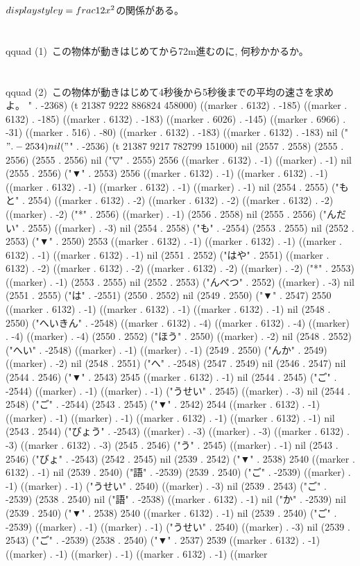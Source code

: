$\\displaystyle y=\\frac{1}{2}x^{2}$の関係がある。
\\\\
\\qquad (1)~この物体が動きはじめてから72m進むのに, 何秒かかるか。
\\\\
\\qquad (2)~この物体が動きはじめて4秒後から5秒後までの平均の速さを求め
よ。
" . -2368) (t 21387 9222 886824 458000) ((marker . 6132) . -185) ((marker . 6132) . -185) ((marker . 6132) . -183) ((marker . 6026) . -145) ((marker . 6966) . -31) ((marker . 516) . -80) ((marker . 6132) . -183) ((marker . 6132) . -183) nil ("$" . -2534) nil ("$" . -2536) (t 21387 9217 782799 151000) nil (2557 . 2558) (2555 . 2556) (2555 . 2556) nil ("▽" . 2555) 2556 ((marker . 6132) . -1) ((marker) . -1) nil (2555 . 2556) ("▼" . 2553) 2556 ((marker . 6132) . -1) ((marker . 6132) . -1) ((marker . 6132) . -1) ((marker . 6132) . -1) ((marker) . -1) nil (2554 . 2555) ("もと" . 2554) ((marker . 6132) . -2) ((marker . 6132) . -2) ((marker . 6132) . -2) ((marker) . -2) ("*" . 2556) ((marker) . -1) (2556 . 2558) nil (2555 . 2556) ("んだい" . 2555) ((marker) . -3) nil (2554 . 2558) ("も" . -2554) (2553 . 2555) nil (2552 . 2553) ("▼" . 2550) 2553 ((marker . 6132) . -1) ((marker . 6132) . -1) ((marker . 6132) . -1) ((marker . 6132) . -1) nil (2551 . 2552) ("はや" . 2551) ((marker . 6132) . -2) ((marker . 6132) . -2) ((marker . 6132) . -2) ((marker) . -2) ("*" . 2553) ((marker) . -1) (2553 . 2555) nil (2552 . 2553) ("んべつ" . 2552) ((marker) . -3) nil (2551 . 2555) ("は" . -2551) (2550 . 2552) nil (2549 . 2550) ("▼" . 2547) 2550 ((marker . 6132) . -1) ((marker . 6132) . -1) ((marker . 6132) . -1) nil (2548 . 2550) ("へいきん" . -2548) ((marker . 6132) . -4) ((marker . 6132) . -4) ((marker) . -4) ((marker) . -4) (2550 . 2552) ("ほう" . 2550) ((marker) . -2) nil (2548 . 2552) ("へい" . -2548) ((marker) . -1) ((marker) . -1) (2549 . 2550) ("んか" . 2549) ((marker) . -2) nil (2548 . 2551) ("へ" . -2548) (2547 . 2549) nil (2546 . 2547) nil (2544 . 2546) ("▼" . 2543) 2545 ((marker . 6132) . -1) nil (2544 . 2545) ("ご" . -2544) ((marker) . -1) ((marker) . -1) ("うせい" . 2545) ((marker) . -3) nil (2544 . 2548) ("ご" . -2544) (2543 . 2545) ("▼" . 2542) 2544 ((marker . 6132) . -1) ((marker) . -1) ((marker) . -1) ((marker . 6132) . -1) ((marker . 6132) . -1) nil (2543 . 2544) ("びょう" . -2543) ((marker) . -3) ((marker) . -3) ((marker . 6132) . -3) ((marker . 6132) . -3) (2545 . 2546) ("う" . 2545) ((marker) . -1) nil (2543 . 2546) ("びょ" . -2543) (2542 . 2545) nil (2539 . 2542) ("▼" . 2538) 2540 ((marker . 6132) . -1) nil (2539 . 2540) ("語" . -2539) (2539 . 2540) ("ご" . -2539) ((marker) . -1) ((marker) . -1) ("うせい" . 2540) ((marker) . -3) nil (2539 . 2543) ("ご" . -2539) (2538 . 2540) nil ("語" . -2538) ((marker . 6132) . -1) nil ("か" . -2539) nil (2539 . 2540) ("▼" . 2538) 2540 ((marker . 6132) . -1) nil (2539 . 2540) ("ご" . -2539) ((marker) . -1) ((marker) . -1) ("うせい" . 2540) ((marker) . -3) nil (2539 . 2543) ("ご" . -2539) (2538 . 2540) ("▼" . 2537) 2539 ((marker . 6132) . -1) ((marker) . -1) ((marker) . -1) ((marker . 6132) . -1) ((marker 
